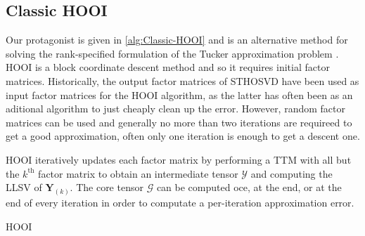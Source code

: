 \subsection{Classic HOOI} \label{sec:Classic HOOI} 

    Our protagonist is given in \cref{alg:Classic-HOOI} and is an alternative
    method for solving the rank-specified formulation of the Tucker
    approximation problem
    \cite{kroonenberg1980principal,de2000best,kapteyn1986approach}. HOOI is a
    block coordinate descent method and so it requires initial factor matrices.
    Historically, the output factor matrices of STHOSVD have been used as input
    factor matrices for the HOOI algorithm, as the latter has often been as an
    aditional algorithm to just cheaply clean up the error. However, random
    factor matrices can be used and generally no more than two iterations are
    requireed to get a good approximation, often only one iteration is enough to
    get a descent one. 

    HOOI iteratively updates each factor matrix by performing a TTM with all but
    the $k^\text{th}$ factor matrix to obtain an intermediate tensor
    $\mathcal{Y}$ and computing the LLSV of $\mathbf{Y}_{(k)}$. The core tensor
    $\mathcal G$ can be computed oce, at the end, or at the end of every
    iteration in order to computate a per-iteration approximation error. 

    \begin{algorithm}
        \caption{HOOI}
        \label{alg:Classic-HOOI}
        \begin{algorithmic}
            
                    \EndFor{}
                \EndFor{}
                 
                 
            \EndFunction
        \end{algorithmic}
    \end{algorithm}

